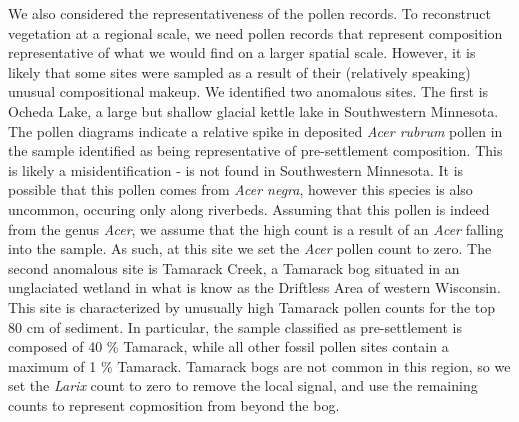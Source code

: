 \documentclass[12pt]{article}
\begin{document}
We also considered the representativeness of the pollen records. To
reconstruct vegetation at a regional scale, we need pollen records
that represent composition representative of what we would find on a
larger spatial scale. However, it is likely that some sites were
sampled as a result of their (relatively speaking) unusual
compositional makeup. We identified two anomalous sites. The first is
Ocheda Lake, a large but shallow glacial kettle lake in Southwestern
Minnesota. The pollen diagrams indicate a relative spike in deposited
\textit{Acer rubrum} pollen in the sample identified as being
representative of pre-settlement composition. This is likely a
misidentification -  is not found in Southwestern
Minnesota. It is possible that this pollen comes from \textit{Acer
  negra}, however this species is also uncommon, occuring only along
riverbeds. Assuming that this pollen is indeed from the genus
\textit{Acer}, we assume that the high count is a result of an
\textit{Acer} falling into the sample. As such, at this site we set
the \textit{Acer} pollen count to zero. The second anomalous site is
Tamarack Creek, a Tamarack bog situated in an unglaciated wetland in
what is know as the Driftless Area of western Wisconsin. This site is
characterized by unusually high Tamarack pollen counts for the top 80
cm of sediment. In particular, the sample classified as pre-settlement
is composed of 40 \% Tamarack, while all other fossil pollen sites
contain a maximum of 1 \% Tamarack. Tamarack bogs are not common in
this region, so we set the \textit{Larix} count to zero to remove the
local signal, and use the remaining counts to represent copmosition
from beyond the bog.

\end{document}
